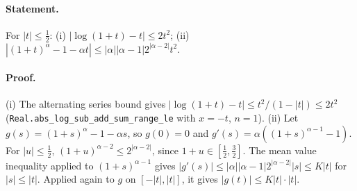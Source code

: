 \paragraph{Statement.} For $|t|\leq\frac12$: (i) $|\log(1+t)-t|\leq2t^2$;
(ii) $|(1+t)^\alpha-1-\alpha t|\leq|\alpha||\alpha-1|2^{|\alpha-2|}t^2$.
\paragraph{Proof.} (i) The alternating series bound gives $|\log(1+t)-t|\leq t^2/(1-|t|)\leq2t^2$
(\texttt{Real.abs\_log\_sub\_add\_sum\_range\_le} with $x=-t$, $n=1$). (ii) Let
$g(s)=(1+s)^\alpha-1-\alpha s$, so $g(0)=0$ and $g'(s)=\alpha((1+s)^{\alpha-1}-1)$. For $|u|\leq\frac12$,
$(1+u)^{\alpha-2}\leq2^{|\alpha-2|}$, since $1+u\in[\frac12,\frac32]$. The mean value inequality applied to
$(1+s)^{\alpha-1}$ gives $|g'(s)|\leq|\alpha||\alpha-1|2^{|\alpha-2|}|s|\leq K|t|$ for $|s|\leq|t|$. Applied
again to $g$ on $[-|t|,|t|]$, it gives $|g(t)|\leq K|t|\cdot|t|$.
